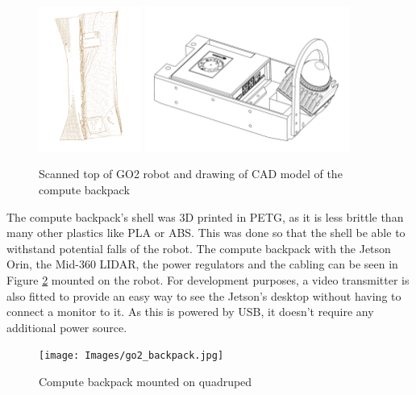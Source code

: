 \documentclass[12pt]{article}
\begin{document}
        \begin{figure}[H]
            \centering
            \includegraphics[width=0.3\textwidth]{Images/ScanGO2Top.pdf}
            \includegraphics[width=0.6\textwidth]{Images/ComputeBackpack.pdf}
            \caption{Scanned top of GO2 robot and drawing of CAD model of the compute backpack }
            \label{fig:scanner_and_cad}
        \end{figure}

        The compute backpack's shell was 3D printed in PETG, as it is less brittle than many other plastics like PLA or ABS. This was done so that the shell be able to withstand potential falls of the robot. The compute backpack with the Jetson Orin, the Mid-360 LIDAR, the power regulators and the cabling can be seen in Figure \ref{fig:compute_backpack} mounted on the robot. For development purposes, a video transmitter is also fitted to provide an easy way to see the Jetson's desktop without having to connect a monitor to it. As this is powered by USB, it doesn't require any additional power source.

        \begin{figure}[H]
            \centering
            \texttt{[image: Images/go2\_backpack.jpg]}
            \caption{Compute backpack mounted on quadruped}
            \label{fig:compute_backpack}
        \end{figure}
\end{document}
